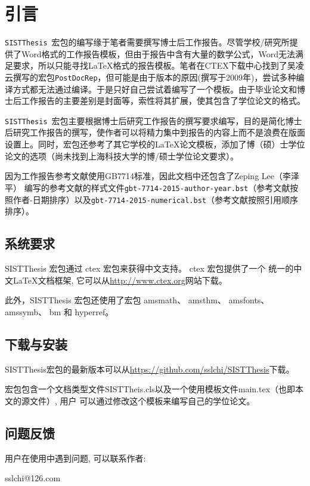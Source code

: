 \chapter{引言}
\texttt{SISTThesis}~宏包的编写缘于笔者需要撰写博士后工作报告。尽管学校/研究所提供了Word格式的工作报告模板，但由于报告中含有大量的数学公式，Word无法满足要求，所以只能寻找\LaTeX 格式的报告模板。笔者在CTEX下载中心找到了吴凌云撰写的宏包\texttt{PostDocRep}，但可能是由于版本的原因(撰写于2009年)，尝试多种编译方式都无法通过编译。于是只好自己尝试着编写了一个模板。由于毕业论文和博士后工作报告的主要差别是封面等，索性将其扩展，使其包含了学位论文的格式。

\texttt{SISTThesis}~宏包主要根据博士后研究工作报告的撰写要求编写，目的是简化博士后研究工作报告的撰写，使作者可以将精力集中到报告的内容上而不是浪费在版面设置上。同时，宏包还参考了其它学校的\LaTeX 论文模板，添加了博（硕）士学位论文的选项（尚未找到上海科技大学的博/硕士学位论文要求）。

因为工作报告参考文献使用GB7714标准，因此文档中还包含了Zeping Lee（李泽平） 编写的参考文献的样式文件\verb|gbt-7714-2015-author-year.bst|（参考文献按照作者-日期排序）以及\verb|gbt-7714-2015-numerical.bst|（参考文献按照引用顺序排序）。
\section{系统要求}
SISTThesis 宏包通过 ctex 宏包来获得中文支持。 ctex 宏包提供了一个
统一的中文\LaTeX 文档框架, 它可以从\url{http://www.ctex.org}网站下载。

此外，SISTThesis 宏包还使用了宏包 amsmath、 amsthm、 amsfonts、
amssymb、 bm 和 hyperref。
\section{下载与安装}
SISTThesis宏包的最新版本可以从\url{https://github.com/sslchi/SISTThesis}下载。

宏包包含一个文档类型文件SISTTheis.cls以及一个使用模板文件main.tex（也即本文的源文件）, 用户
可以通过修改这个模板来编写自己的学位论文。
\section{问题反馈}
用户在使用中遇到问题, 可以联系作者:
\begin{center}
      sslchi@126.com
\end{center}